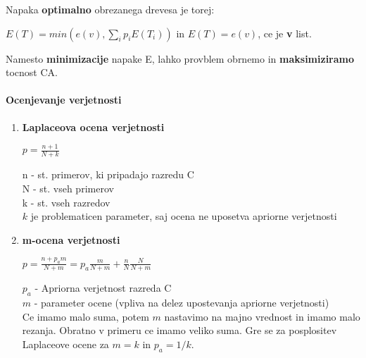 \documentclass{article}
\begin{document}
\begin{multicols}{2}
\begin{enumerate}
  Napaka \textbf{optimalno} obrezanega drevesa je torej:
  \begin{center}
    \begin{math}
      E(T) = min(e(v), \sum_i p_i E(T_i))
    \end{math} in
    \begin{math}
      E(T) = e(v)
    \end{math}, ce je \textbf{v} list.
  \end{center}

  Namesto \textbf{minimizacije} napake E, lahko provblem obrnemo in \textbf{maksimiziramo} tocnost CA.
\end{enumerate}

\paragraph{Ocenjevanje verjetnosti}

\begin{enumerate}
  \item \textbf{Laplaceova ocena verjetnosti}
    \begin{center}
      \begin{math}
        p = \frac{n+1}{N+k}
      \end{math}
    \end{center}

    n - st. primerov, ki pripadajo razredu C\\
    N - st. vseh primerov\\
    k - st. vseh razredov\\
    $k$ je problematicen parameter, saj ocena ne uposetva apriorne verjetnosti

  \item \textbf{m-ocena verjetnosti}
    \begin{center}
      \begin{math}
        p = \frac{n+ p_a m}{N+m} = p_a \frac{m}{N+m} + \frac{n}{N}\frac{N}{N + m}
      \end{math}
    \end{center}

    $p_a$ - Apriorna verjetnost razreda C\\
    $m$ - parameter ocene (vpliva na delez upostevanja apriorne verjetnosti)\\
    Ce imamo malo suma, potem $m$ nastavimo na majno vrednost in imamo malo rezanja. Obratno v primeru ce imamo veliko suma.
    Gre se za posplositev Laplaceove ocene za $m=k$ in $p_a = 1/k$.
\end{enumerate}

\end{multicols}
\end{document}
